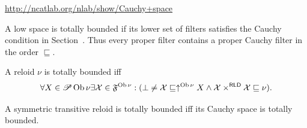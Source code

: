 \url{http://ncatlab.org/nlab/show/Cauchy+space}

A low space is totally bounded if its lower set of filters satisfies
the Cauchy condition in Section~.
Thus every proper filter contains a proper Cauchy filter in the
order $\sqsubseteq$.

\begin{obvious}
A reloid $\nu$ is totally bounded iff
\[ \forall X \in \mathscr{P} \operatorname{Ob} \nu \exists \mathcal{X} \in
   \mathfrak{F}^{\operatorname{Ob} \nu} : (\bot \neq \mathcal{X} \sqsubseteq
   \uparrow^{\operatorname{Ob} \nu} X \wedge \mathcal{X} \times^{\mathsf{RLD}}
   \mathcal{X} \sqsubseteq \nu) . \]
\end{obvious}

\begin{thm}
  A symmetric transitive reloid is totally bounded iff its Cauchy space is
  totally bounded.
\end{thm}

